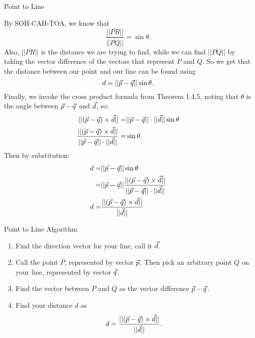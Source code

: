 \begin{claim}{Point to Line}
\begin{center}
\begin{tikzpicture}
\end{tikzpicture}
\end{center}
\vspace{1em}
By SOH-CAH-TOA, we know that $$\frac{||\overline{PR}||}{||\overline{PQ}||}=\sin\theta.$$
Also, $||\overline{PR}||$ is the distance we are trying to find, while we can find $||\overline{PQ}||$ by taking the vector difference of the vectors that represent $P$ and $Q$. So we get that the distance between our point and our line can be found using $$d=||\vcp-\vcq||\sin\theta .$$
Finally, we invoke the cross product formula from Theorem 1.4.5, noting that $\theta$ is the angle between $\vcp-\vcq$ and $\vcd$, so:
\begin{align*}
||(\vcp-\vcq)\times\vcd||=&||\vcp-\vcq||\cdot ||\vcd||\sin\theta\\
\frac{||(\vcp-\vcq)\times\vcd||}{||\vcp-\vcq||\cdot ||\vcd||}=&\sin\theta.
\end{align*}
Then by substitution:
\begin{align*}
d=&||\vcp-\vcq||\sin\theta\\
=&||\vcp-\vcq||\frac{||(\vcp-\vcq)\times\vcd||}{||\vcp-\vcq||\cdot ||\vcd||}\\
d=&\frac{||(\vcp-\vcq)\times\vcd||}{ ||\vcd||}
\end{align*}
\end{claim}

\begin{claim}{Point to Line Algorithm}
\begin{enumerate}
\item Find the direction vector for your line, call it $\vcd$.
\vspace{1em}
\item Call the point $P$, represented by vector $\vcp$. Then pick an arbitrary point $Q$ on your line, represented by vector $\vcq$.
\vspace{1em}
\item Find the vector between $P$ and $Q$ as the vector difference $\vcp-\vcq$.
\vspace{1em}
\item Find your distance $d$ as $$d=\frac{||(\vcp-\vcq)\times\vcd||}{ ||\vcd||}. $$
\end{enumerate}
\end{claim}

